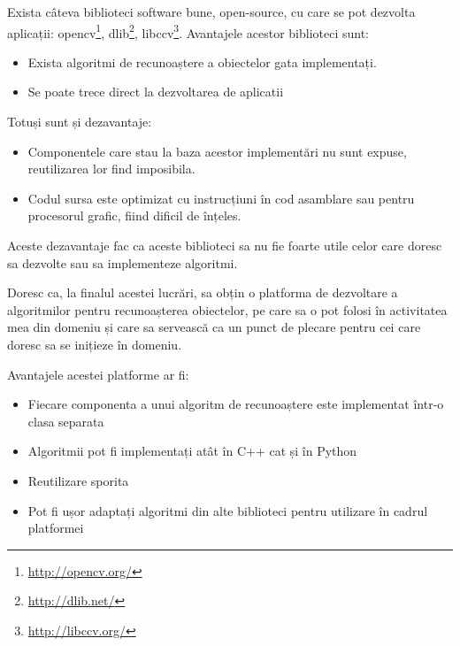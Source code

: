 Exista câteva biblioteci software bune, open-source, cu care se pot dezvolta aplicații: 
opencv\footnote{\url{http://opencv.org/}}, 
dlib\footnote{\url{http://dlib.net/}}, 
libccv\footnote{\url{http://libccv.org/}}.
Avantajele acestor biblioteci sunt:
\begin{itemize}
	\item Exista algoritmi de recunoaștere a obiectelor gata implementați.
	\item Se poate trece direct la dezvoltarea de aplicatii
\end{itemize}
Totuși sunt și dezavantaje:
\begin{itemize}
	\item Componentele care stau la baza acestor implementări nu sunt expuse, reutilizarea lor find imposibila.
	\item Codul sursa este optimizat cu instrucțiuni în cod asamblare sau pentru procesorul grafic, fiind dificil de înțeles.
\end{itemize}
Aceste dezavantaje fac ca aceste biblioteci sa nu fie foarte utile celor care doresc sa dezvolte sau sa implementeze algoritmi.

Doresc ca, la finalul acestei lucrări, sa obțin o platforma de dezvoltare a algoritmilor pentru recunoașterea obiectelor, pe care sa o pot folosi în activitatea mea din domeniu și care sa servească ca un punct de plecare pentru cei care doresc sa se inițieze în domeniu.

Avantajele acestei platforme ar fi:
\begin{itemize}
	\item Fiecare componenta a unui algoritm de recunoaștere este implementat într-o clasa separata
	\item Algoritmii pot fi implementați atât în C++ cat și în Python
	\item Reutilizare sporita
	\item Pot fi ușor adaptați algoritmi din alte biblioteci pentru utilizare în cadrul platformei
\end{itemize}



